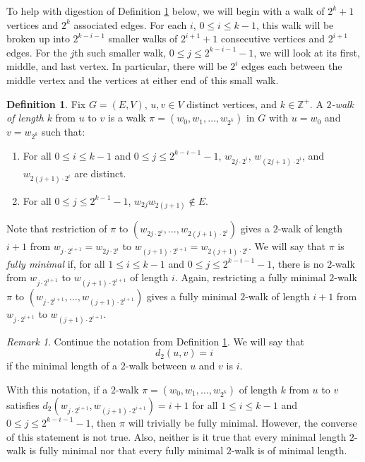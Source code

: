 \documentclass[12pt]{amsart}
\theoremstyle{definition}
\newtheorem{definition}[theorem]{Definition}
\theoremstyle{remark}
\newtheorem{remark}[theorem]{Remark}
\numberwithin{equation}{section}
\numberwithin{figure}{section}
\newcommand{\Z}{\mathbb{Z}}
\begin{document}
To help with digestion of Definition \ref{def:2walk} below, we will begin with a walk of $2^k + 1$ vertices and $2^k$ associated edges. For each $i$, $0 \leq i \leq k-1$, this walk will be broken up into $2^{k-i-1}$ smaller walks of $2^{i+1} + 1$ consecutive vertices and $2^{i+1}$ edges. For the $j$th such smaller walk, $0 \leq j \leq 2^{k-i-1}-1$, we will look at its first, middle, and last vertex. In particular, there will be $2^i$ edges each between the middle vertex and the vertices at either end of this small walk.
\begin{definition} \label{def:2walk}
    Fix $G=(E,V)$, $u,v \in V$ distinct vertices, and $k\in\Z^+$. A \emph{$2$-walk of length $k$} from $u$ to $v$ is a walk $\pi = (w_0,w_1,\dots,w_{2^k})$ in $G$ with $u=w_0$ and $v=w_{2^k}$ such that:    
    \begin{enumerate}
        \item For all $0 \leq i \leq k-1$ and $0 \leq j \leq 2^{k-i-1}-1$, 
            $w_{2j\cdot2^i}$, $w_{(2j+1)\cdot2^i}$, and $w_{2(j+1)\cdot2^i}$ are distinct.
        \item For all $0 \leq j \leq 2^{k-1}-1$, $w_{2j}w_{2(j+1)} \notin E$.
    \end{enumerate}
    Note that restriction of $\pi$ to $(w_{2j\cdot 2^i}, \ldots, w_{2(j+1)\cdot 2^i})$ gives a $2$-walk of length $i+1$ from $w_{j\cdot 2^{i+1}}=w_{2j\cdot 2^i}$ to $w_{(j+1)\cdot 2^{i+1}} =w_{2(j+1)\cdot 2^i}$.
    We will say that $\pi$ is \emph{fully minimal} if, for all $1 \leq i \leq k-1$ and $0 \leq j \leq 2^{k-i-1}-1$, there is no $2$-walk from $w_{j\cdot 2^{i+1}}$ to $w_{(j+1)\cdot 2^{i+1}}$ of length $i$. Again, restricting a fully minimal $2$-walk $\pi$ to $(w_{j\cdot 2^{i+1}}, \ldots, w_{(j+1)\cdot 2^{i+1}})$ gives a fully minimal $2$-walk of length $i+1$ from $w_{j\cdot 2^{i+1}}$ to $w_{(j+1)\cdot 2^{i+1}}$.
\end{definition}

\begin{remark} \label{rmk: min min is fully minimal}
    Continue the notation from Definition \ref{def:2walk}. We will say that 
    \[ d_2(u,v) = i \]
    if the minimal length of a $2$-walk between $u$ and $v$ is $i$. 
    
    With this notation, if a $2$-walk $\pi = (w_0,w_1,\dots,w_{2^k})$ of length $k$ 
    from $u$ to $v$ satisfies $d_2(w_{j\cdot 2^{i+1}}, w_{(j+1)\cdot 2^{i+1}})=i+1$ for all $1 \leq i \leq k-1$ and $0 \leq j \leq 2^{k-i-1}-1$, then $\pi$ will trivially be fully minimal. However, the converse of this statement is not true. Also, neither is it true that every minimal length $2$-walk is fully minimal nor that every fully minimal $2$-walk is of minimal length.
\end{remark}
\end{document}
